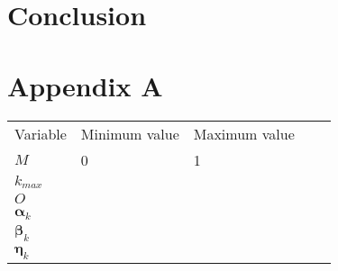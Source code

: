 \documentclass[runningheads]{llncs}
\begin{document}
\section{Conclusion}


\section*{Appendix A}
\label{AppA}
\begin{table}[]
\begin{tabular}{|l|l|l|ll}
\cline{1-3}
Variable & Minimum value & Maximum value &  &  \\  \cline{1-3}
$M$  & 0   & 1   &  &  \\  \cline{1-3}
$ k_{max} $    &     &     &  &  \\  \cline{1-3}
$ O $    &     &     &  &   \\  \cline{1-3}
$ \boldsymbol{\alpha}_k $    &     &     &  &  \\  \cline{1-3}
$ \boldsymbol{\beta}_k $    &     &     &  &  \\  \cline{1-3}
$ \boldsymbol{\eta}_k $    &     &     &  & \\  \cline{1-3}
\end{tabular}
\end{table}




\appendix
\end{document}
